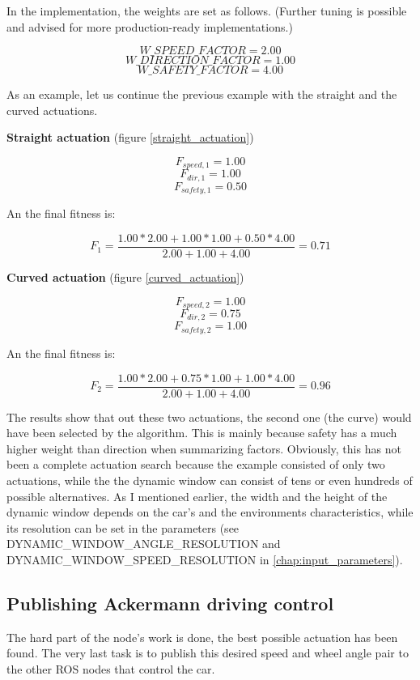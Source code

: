 {\begin{minipage}{\textwidth}
In the implementation, the weights are set as follows. (Further tuning is possible and advised for more production-ready implementations.)

\[ W\_SPEED\_FACTOR = 2.00 \]
\[ W\_DIRECTION\_FACTOR = 1.00 \]
\[ W\_SAFETY\_FACTOR = 4.00 \]
\end{minipage}

As an example, let us continue the previous example with the straight and the curved actuations.

\begin{minipage}{\textwidth}
\textbf{Straight actuation} (figure \ref{straight_actuation})

\[ F_{speed,1} = 1.00 \]
\[ F_{dir,1} = 1.00 \]
\[ F_{safety,1} = 0.50 \]

An the final fitness is:

\[ F_{1} = \frac{1.00 * 2.00 + 1.00 * 1.00 + 0.50 * 4.00}{2.00 + 1.00 + 4.00} = 0.71 \]
\end{minipage}

\begin{minipage}{\textwidth}
\textbf{Curved actuation} (figure \ref{curved_actuation})

\[ F_{speed,2} = 1.00 \]
\[ F_{dir,2} = 0.75 \]
\[ F_{safety,2} = 1.00 \]

An the final fitness is:

\[ F_{2} = \frac{1.00 * 2.00 + 0.75 * 1.00 + 1.00 * 4.00}{2.00 + 1.00 + 4.00} = 0.96 \]
\end{minipage}

The results show that out these two actuations, the second one (the curve) would have been selected by the algorithm. This is mainly because safety has a much higher weight than direction when summarizing factors. Obviously, this has not been a complete actuation search because the example consisted of only two actuations, while the the dynamic window can consist of tens or even hundreds of possible alternatives. As I mentioned earlier, the width and the height of the dynamic window depends on the car's and the environments characteristics, while its resolution can be set in the parameters (see DYNAMIC\_WINDOW\_ANGLE\_RESOLUTION and DYNAMIC\_WINDOW\_SPEED\_RESOLUTION in \ref{chap:input_parameters}).

\subsection{Publishing Ackermann driving control}
The hard part of the node's work is done, the best possible actuation has been found. The very last task is to publish this desired speed and wheel angle pair to the other ROS nodes that control the car.

}
